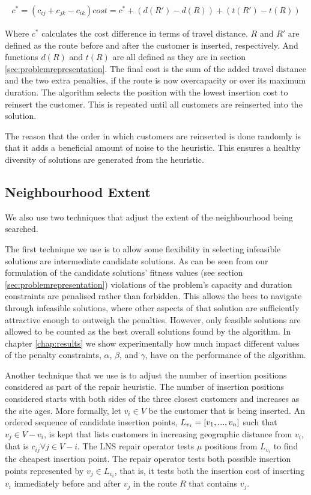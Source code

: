 \begin{align}
   c^* = (c_{ij} + c_{jk} - c_{ik}) 
   cost = c^* + (d(R') - d(R)) + (t(R') - t(R))
\end{align}

Where $c^*$ calculates the cost difference in terms of travel distance. $R$ and $R'$ are defined as the route before and after the customer is inserted, respectively. And functions $d(R)$ and $t(R)$ are all defined as they are in section \ref{sec:problemrepresentation}. The final cost is the sum of the added travel distance and the two extra penalties, if the route is now overcapacity or over its maximum duration. The algorithm selects the position with the lowest insertion cost to reinsert the customer. This is repeated until all customers are reinserted into the solution. 

The reason that the order in which customers are reinserted is done randomly is that it adds a beneficial amount of noise to the heuristic. This ensures a healthy diversity of solutions are generated from the heuristic. 

\subsection{Neighbourhood Extent}
\label{subsec:neighborhoodscope}

We also use two techniques that adjust the extent of the neighbourhood being searched. 

The first technique we use is to allow some flexibility in selecting infeasible solutions are intermediate candidate solutions. As can be seen from our formulation of the candidate solutions' fitness values (see section \ref{sec:problemrepresentation}) violations of the problem's capacity and duration constraints are penalised rather than forbidden. This allows the bees to navigate through infeasible solutions, where other aspects of that solution are sufficiently attractive enough to outweigh the penalties. However, only feasible solutions are allowed to be counted as the best overall solutions found by the algorithm. In chapter \ref{chap:results} we show experimentally how much impact different values of the penalty constraints, $\alpha$, $\beta$, and $\gamma$, have on the performance of the algorithm.

Another technique that we use is to adjust the number of insertion positions considered as part of the repair heuristic. The number of insertion positions considered starts with both sides of the three closest customers and increases as the site ages. More formally, let $v_i \in V$ be the customer that is being inserted. An ordered sequence of candidate insertion points, $L_{v_i} = [v_1,...,v_n]$ such that $v_j \in V - v_i$, is kept that lists customers in increasing geographic distance from $v_i$, that is $c_{ij} \forall j \in V - i$. The LNS repair operator tests $\mu$ positions from $L_{v_i}$ to find the cheapest insertion point. The repair operator tests both possible insertion points represented by $v_j \in L_{v_i}$, that is, it tests both the insertion cost of inserting $v_i$ immediately before and after $v_j$ in the route $R$ that contains $v_j$. 

